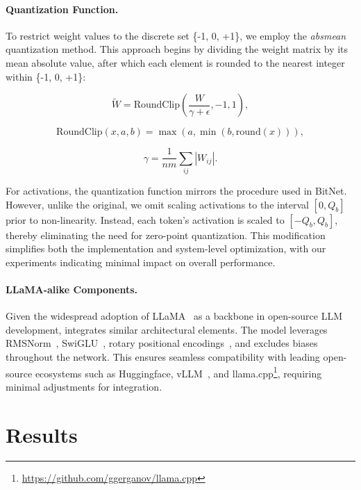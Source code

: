 \paragraph{Quantization Function.} To restrict weight values to the discrete set \{-1, 0, +1\}, we employ the \emph{absmean} quantization method. This approach begins by dividing the weight matrix by its mean absolute value, after which each element is rounded to the nearest integer within \{-1, 0, +1\}:

\begin{equation}
    \widetilde{W} = \mathrm{RoundClip}(\frac{W}{\gamma + \epsilon}, -1, 1),
\end{equation}

\begin{equation}
    \mathrm{RoundClip}(x, a, b) = \max(a, \min(b, \mathrm{round}(x))),
\end{equation}

\begin{equation}
    \gamma = \frac{1}{nm}\sum_{ij} |W_{ij}|.
\end{equation}

For activations, the quantization function mirrors the procedure used in BitNet. However, unlike the original, we omit scaling activations to the interval $[0, Q_b]$ prior to non-linearity. Instead, each token’s activation is scaled to $[-Q_b, Q_b]$, thereby eliminating the need for zero-point quantization. This modification simplifies both the implementation and system-level optimization, with our experiments indicating minimal impact on overall performance.

\paragraph{LLaMA-alike Components.}

Given the widespread adoption of LLaMA~\cite{llama, llama2} as a backbone in open-source LLM development,  integrates similar architectural elements. The model leverages RMSNorm~\cite{rmsnorm}, SwiGLU~\cite{swiglu}, rotary positional encodings~\cite{rope}, and excludes biases throughout the network. This ensures seamless compatibility with leading open-source ecosystems such as Huggingface, vLLM~\cite{vllm}, and llama.cpp\footnote{\url{https://github.com/ggerganov/llama.cpp}}, requiring minimal adjustments for integration.

\section{Results}

